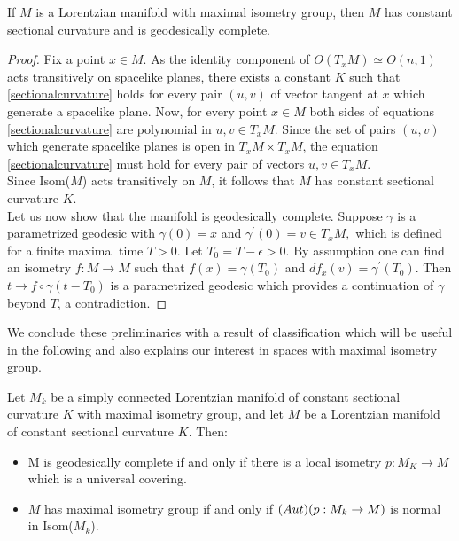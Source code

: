 \begin{lemma}\label{maximalisometry}
    If $M$ is a Lorentzian manifold with maximal isometry group, then $M$ has constant sectional curvature and is geodesically complete.
\end{lemma}

\begin{proof}
    Fix a point $x\in M$. As the identity component of $O(T_x M)\simeq O(n,1)$ acts transitively on spacelike planes, there exists a constant $K$ such that \ref{sectionalcurvature} holds for every pair $(u,v)$ of vector tangent at $x$ which generate a spacelike plane. Now, for every point $x\in M$ both sides of equations \ref{sectionalcurvature} are polynomial in $u,v \in T_xM$. Since the set of pairs $(u,v)$ which generate spacelike planes is open in $T_{x}M\times T_{x}M$, the equation \ref{sectionalcurvature} must hold for every pair of vectors $u,v \in T_xM$.\\ Since Isom($M$) acts transitively on $M$, it follows that $M$ has constant sectional curvature $K$.\\
    Let us now show that the manifold is geodesically complete. Suppose $\gamma$ is a parametrized geodesic with $\gamma(0)=x$ and $\gamma^{\prime} (0)=v\in T_xM,$ which is defined for a finite maximal time $T>0.$ Let $T_0=T-\epsilon>0.$ By assumption one can find an isometry $f:M\to M$ such that $f(x)=\gamma(T_0)$ and $df_x(v)=\gamma^{\prime}(T_0).$ Then $t\to f\circ\gamma(t-T_0)$ is a parametrized geodesic which provides a continuation of $\gamma$ beyond $T$, a contradiction. 
\end{proof}

We conclude these preliminaries with a result of classification which will be useful in the following and also explains our interest in spaces with maximal isometry group.
\begin{proposition}\label{classification}
    Let $M_k$ be a simply connected Lorentzian manifold of constant sectional curvature $K$ with maximal isometry group, and let $M$ be a Lorentzian manifold of constant sectional curvature $K$. Then: 
    \begin{itemize}
        \item M is geodesically complete if and only if there is a local isometry $p:M_K\to M$ which is a universal covering.
        \item $M$ has maximal isometry group if and only if $\text(Aut)(p:M_k\to M)$ is normal in Isom($M_k$). 
    \end{itemize}
\end{proposition}

